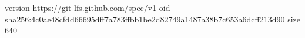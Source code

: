 version https://git-lfs.github.com/spec/v1
oid sha256:4c0ae48cfdd66695dff7a783ffbb1be2d82749a1487a38b7c653a6dcff213d90
size 640
